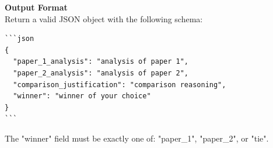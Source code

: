 \vspace{1em}
\noindent\textbf{Output Format}\\
\vspace{0.5em}
Return a valid JSON object with the following schema:

\begin{verbatim}
```json
{
  "paper_1_analysis": "analysis of paper 1",
  "paper_2_analysis": "analysis of paper 2",
  "comparison_justification": "comparison reasoning",
  "winner": "winner of your choice"
}
```
\end{verbatim}

\noindent The "winner" field must be exactly one of: "paper\_1", "paper\_2", or "tie".
